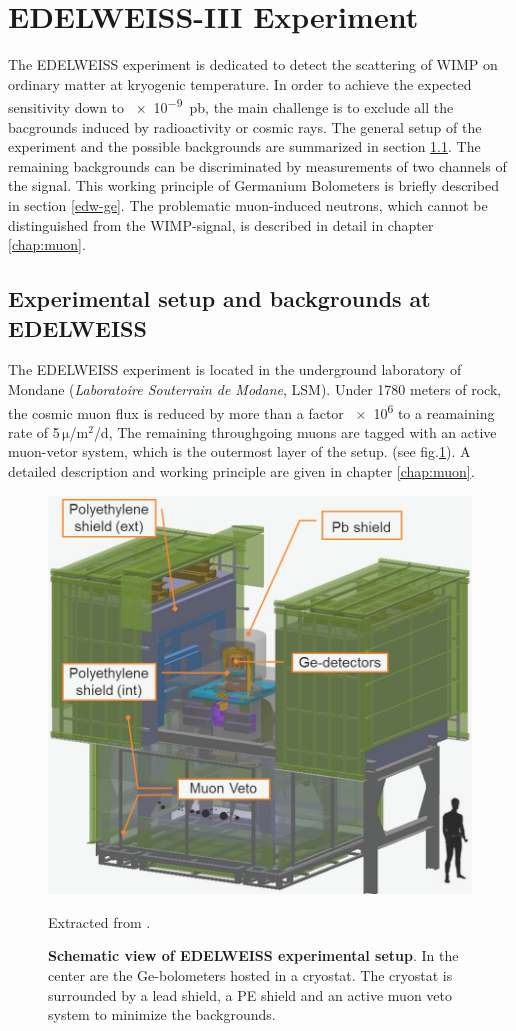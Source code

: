 \section{EDELWEISS-III Experiment}
  \label{edw}
  The EDELWEISS experiment is dedicated to detect the scattering of WIMP on ordinary matter at kryogenic temperature. In order to achieve the expected sensitivity down to \SI{e-9}{pb}, the main challenge is to exclude all the bacgrounds induced by radioactivity or cosmic rays. The general setup of the experiment and the possible backgrounds are summarized in section \ref{sec:edw-exp}. The remaining backgrounds can be discriminated by measurements of two channels of the signal. This working principle of Germanium Bolometers is briefly described in section \ref{edw-ge}.
  The problematic muon-induced neutrons, which cannot be distinguished from the WIMP-signal, is described in detail in chapter \ref{chap:muon}.
\subsection{Experimental setup and backgrounds at EDELWEISS}
  \label{sec:edw-exp}
  The EDELWEISS experiment is located in the underground laboratory of Mondane (\textit{Laboratoire Souterrain de Modane}, LSM). Under 1780 meters of rock, the cosmic muon flux is reduced by more than a factor \num{e6} to a reamaining rate of 5\,$\mathrm{\mu}$/$\mathrm{m}^{2}$/d, %
  The remaining throughgoing muons are tagged with an active muon-vetor system, which is the outermost layer of the setup. (see fig.\ref{fig:exp-setup}). A detailed description and working principle are given in chapter \ref{chap:muon}.

  \begin{figure}[ht]
    \centering
    \includegraphics[width=0.75\textwidth{}]{./fig/exp_setup.png}
    \caption{\textbf{Schematic view of EDELWEISS experimental setup}.
    In the center are the Ge-bolometers hosted in a cryostat. The cryostat is surrounded by a lead shield, a PE shield and an active muon veto system to minimize the backgrounds.} Extracted from \cite{Kef16}.
    \label{fig:exp-setup}
  \end{figure}


